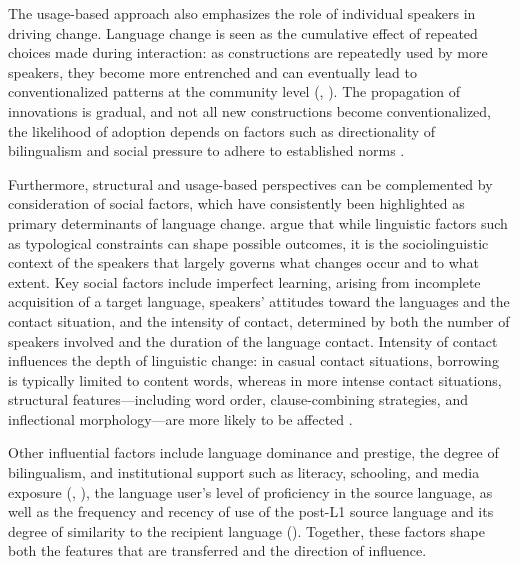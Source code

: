 The usage-based approach also emphasizes the role of individual speakers in driving change. Language change is seen as the cumulative effect of repeated choices made during interaction: as constructions are repeatedly used by more speakers, they become more entrenched and can eventually lead to conventionalized patterns at the community level (\citealt{Nicolai2014}, \citealt{Bybee2006}). The propagation of innovations is gradual, and not all new constructions become conventionalized, the likelihood of adoption depends on factors such as directionality of bilingualism and social pressure to adhere to established norms \citep{Matras2020}.

Furthermore, structural and usage-based perspectives can be complemented by consideration of social factors, which have consistently been highlighted as primary determinants of language change. \citet{ThomasonKaufman1988} argue that while linguistic factors such as typological constraints can shape possible outcomes, it is the sociolinguistic context of the speakers that largely governs what changes occur and to what extent. Key social factors include imperfect learning, arising from incomplete acquisition of a target language, speakers’ attitudes toward the languages and the contact situation, and the intensity of contact, determined by both the number of speakers involved and the duration of the language contact. Intensity of contact influences the depth of linguistic change: in casual contact situations, borrowing is typically limited to content words, whereas in more intense contact situations, structural features—including word order, clause-combining strategies, and inflectional morphology—are more likely to be affected \citep{Thomason2022}.

Other influential factors include language dominance and prestige, the degree of bilingualism, and institutional support such as literacy, schooling, and media exposure (\citealt{Johanson2002}, \citealt{Matras2020}), the language user’s level of proficiency in the source language, as well as the frequency and recency of use of the post-L1 source language and its degree of similarity to the recipient language (\citealt{jarvis_crosslinguistic_2008}). Together, these factors shape both the features that are transferred and the direction of influence.

